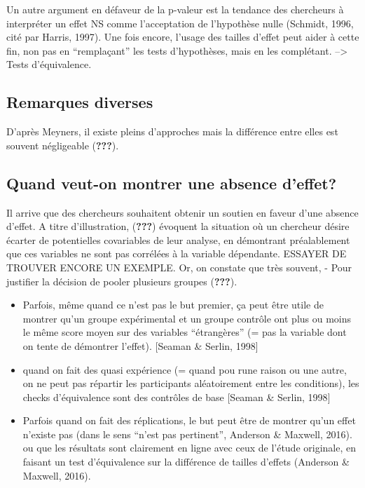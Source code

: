 \documentclass[
  english,
  man]{apa6}
\begin{document}
Un autre argument en défaveur de la p-valeur est la tendance des chercheurs à interpréter un effet NS comme l'acceptation de l'hypothèse nulle (Schmidt, 1996, cité par Harris, 1997). Une fois encore, l'usage des tailles d'effet peut aider à cette fin, non pas en \enquote{remplaçant} les tests d'hypothèses, mais en les complétant. --\textgreater{} Tests d'équivalence.

\hypertarget{remarques-diverses}{%
\subsection{Remarques diverses}\label{remarques-diverses}}

D'après Meyners, il existe pleins d'approches mais la différence entre elles est souvent négligeable ({\textbf{???}}).

\hypertarget{quand-veut-on-montrer-une-absence-deffet}{%
\subsection{Quand veut-on montrer une absence d'effet?}\label{quand-veut-on-montrer-une-absence-deffet}}

Il arrive que des chercheurs souhaitent obtenir un soutien en faveur d'une absence d'effet. A titre d'illustration, ({\textbf{???}}) évoquent la situation où un chercheur désire écarter de potentielles covariables de leur analyse, en démontrant préalablement que ces variables ne sont pas corrélées à la variable dépendante. ESSAYER DE TROUVER ENCORE UN EXEMPLE. Or, on constate que très souvent,
- Pour justifier la décision de pooler plusieurs groupes ({\textbf{???}}).

\begin{itemize}
\item
  Parfois, même quand ce n'est pas le but premier, ça peut être utile de montrer qu'un groupe expérimental et un groupe contrôle ont plus ou moins le même score moyen sur des variables \enquote{étrangères} (= pas la variable dont on tente de démontrer l'effet). {[}Seaman \& Serlin, 1998{]}
\item
  quand on fait des quasi expérience (= quand pou rune raison ou une autre, on ne peut pas répartir les participants aléatoirement entre les conditions), les checks d'équivalence sont des contrôles de base {[}Seaman \& Serlin, 1998{]}
\item
  Parfois quand on fait des réplications, le but peut être de montrer qu'un effet n'existe pas (dans le sens \enquote{n'est pas pertinent}, Anderson \& Maxwell, 2016). ou que les résultats sont clairement en ligne avec ceux de l'étude originale, en faisant un test d'équivalence sur la différence de tailles d'effets (Anderson \& Maxwell, 2016).
\end{itemize}
\end{document}

